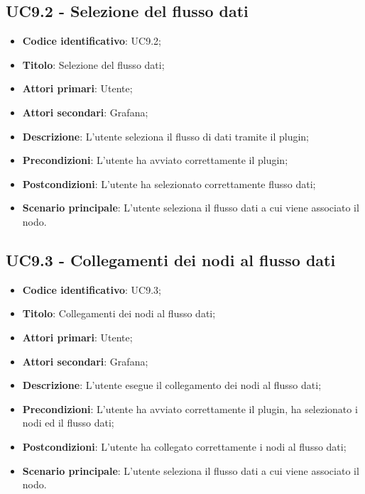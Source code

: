 \subsection{UC9.2 - Selezione del flusso dati}
\begin{itemize}
	\item \textbf{Codice identificativo}: UC9.2;
	\item \textbf{Titolo}: Selezione del flusso dati;
	\item \textbf{Attori primari}: Utente;
	\item \textbf{Attori secondari}: Grafana\glo;
	\item \textbf{Descrizione}: L'utente seleziona il flusso di dati tramite il plugin;
	\item \textbf{Precondizioni}: L'utente ha avviato correttamente il plugin;
	\item \textbf{Postcondizioni}: L'utente ha selezionato correttamente flusso dati;
	\item \textbf{Scenario principale}: L'utente seleziona il flusso dati a cui viene associato il nodo.
\end{itemize}

\subsection{UC9.3 - Collegamenti dei nodi al flusso dati}
\begin{itemize}
	\item \textbf{Codice identificativo}: UC9.3;
	\item \textbf{Titolo}: Collegamenti dei nodi al flusso dati;
	\item \textbf{Attori primari}: Utente;
	\item \textbf{Attori secondari}: Grafana\glo;
	\item \textbf{Descrizione}: L'utente esegue il collegamento dei nodi al flusso dati;
	\item \textbf{Precondizioni}: L'utente ha avviato correttamente il plugin, ha selezionato i nodi ed il flusso dati;
	\item \textbf{Postcondizioni}: L'utente ha collegato correttamente i nodi al flusso dati;
	\item \textbf{Scenario principale}: L'utente seleziona il flusso dati a cui viene associato il nodo.
\end{itemize}

